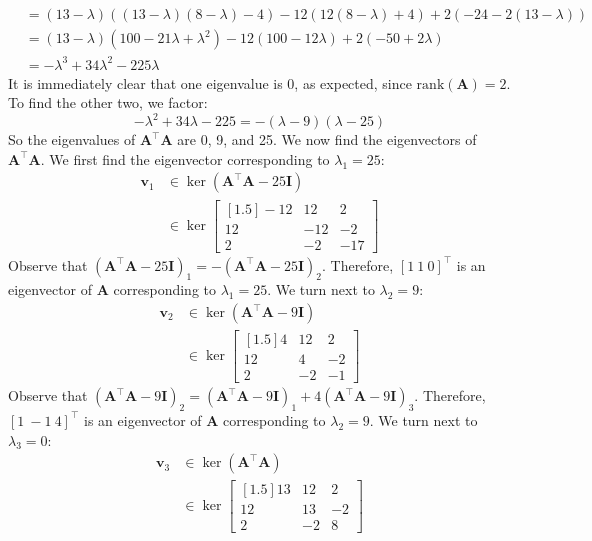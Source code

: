 \documentclass{article}
\begin{document}
\begin{enumerate}[label=(\alph*)]
{\begin{align*}
&= (13 - \lambda)((13 - \lambda)(8 - \lambda) - 4) - 12(12(8 - \lambda) + 4) + 2(-24 - 2(13 - \lambda)) \\
&= (13 - \lambda)(100 - 21\lambda + \lambda^2) - 12(100 - 12\lambda) + 2(-50 + 2\lambda) \\
&=  - \lambda^3 + 34\lambda^2 - 225\lambda 
\end{align*} It is immediately clear that one eigenvalue is 0, as expected, since $\text{rank}(\mathbf{A}) = 2$. To find the other two, we factor: $$-\lambda^2 + 34\lambda - 225 = -(\lambda - 9)(\lambda - 25)$$ So the eigenvalues of $\mathbf{A^{\top}A}$ are 0, 9, and 25. We now find the eigenvectors of $\mathbf{A^{\top}A}$. We first find the eigenvector corresponding to $\lambda_1 = 25$: \begin{align*}
\mathbf{v}_1 &\in \ker(\mathbf{A^{\top}A} - 25\mathbf{I}) \\
&\in \ker\begin{bmatrix}[1.5] -12 & 12 & 2 \\ 12 & -12 & -2 \\ 2 & -2 & -17 \end{bmatrix}
\end{align*} Observe that $(\mathbf{A^{\top}A} - 25\mathbf{I})_1 = -(\mathbf{A^{\top}A} - 25\mathbf{I})_2$. Therefore, $[1\ 1\ 0]^{\top}$ is an eigenvector of $\mathbf{A}$ corresponding to $\lambda_1 = 25$. We turn next to $\lambda_2 = 9$:  \begin{align*}
\mathbf{v}_2 &\in \ker(\mathbf{A^{\top}A} - 9\mathbf{I}) \\
&\in \ker\begin{bmatrix}[1.5] 4 & 12 & 2 \\ 12 & 4 & -2 \\ 2 & -2 & -1 \end{bmatrix}
\end{align*} Observe that $(\mathbf{A^{\top}A} - 9\mathbf{I})_2 = (\mathbf{A^{\top}A} - 9\mathbf{I})_1 + 4(\mathbf{A^{\top}A} - 9\mathbf{I})_3$. Therefore, $[1\ -1\ 4]^{\top}$ is an eigenvector of $\mathbf{A}$ corresponding to $\lambda_2 = 9$. We turn next to $\lambda_3 = 0$: \begin{align*}
\mathbf{v}_3 &\in \ker(\mathbf{A^{\top}A}) \\
&\in \ker\begin{bmatrix}[1.5] 13 & 12 & 2 \\ 12 & 13 & -2 \\ 2 & -2 & 8 \end{bmatrix}

\end{align*}}
\end{enumerate}
\end{document}
